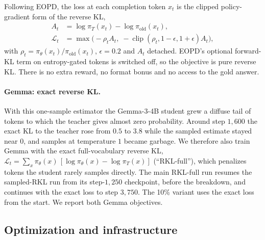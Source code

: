 Following EOPD, the loss at each completion token $x_t$ is the clipped policy-gradient
form of the reverse KL,
\begin{equation}
\begin{aligned}
  A_t &= \log\pi_T(x_t) - \log\pi_{\text{old}}(x_t),\\
  \mathcal{L}_t &= \max\!\big(-\rho_t A_t,\; -\operatorname{clip}(\rho_t,1{-}\epsilon,1{+}\epsilon)A_t\big),
\end{aligned}
\end{equation}
with $\rho_t=\pi_\theta(x_t)/\pi_{\text{old}}(x_t)$, $\epsilon{=}0.2$ and $A_t$
detached. EOPD's optional forward-KL term on entropy-gated tokens is switched off, so the
objective is pure reverse KL. There is no extra reward, no format bonus and no access to
the gold answer.

\paragraph{Gemma: exact reverse KL.}
With this one-sample estimator the Gemma-3-4B student grew a diffuse tail of tokens to
which the teacher gives almost zero probability. Around step $1{,}600$ the exact KL to the
teacher rose from $0.5$ to $3.8$ while the sampled estimate stayed near $0$, and samples
at temperature $1$ became garbage. We therefore also train Gemma with the exact
full-vocabulary reverse KL,
$\mathcal{L}_t=\sum_x \pi_\theta(x)\,[\log\pi_\theta(x)-\log\pi_T(x)]$ (``RKL-full''),
which penalizes tokens the student rarely samples directly. The main RKL-full run resumes
the sampled-RKL run from its step-$1{,}250$ checkpoint, before the breakdown, and
continues with the exact loss to step $3{,}750$. The 10\% variant uses the exact loss
from the start. We report both Gemma objectives.

\subsection{Optimization and infrastructure}
\label{sec:supp_train_opt}

